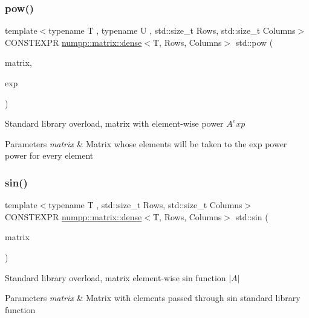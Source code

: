 \subsubsection{\texorpdfstring{pow()}{pow()}}
{\footnotesize\ttfamily template$<$typename T , typename U , std\+::size\+\_\+t Rows, std\+::size\+\_\+t Columns$>$ \\
C\+O\+N\+S\+T\+E\+X\+PR \hyperlink{classnumpp_1_1matrix_1_1dense}{numpp\+::matrix\+::dense}$<$T, Rows, Columns$>$ std\+::pow (\begin{DoxyParamCaption}\item[{const \hyperlink{classnumpp_1_1matrix_1_1dense}{numpp\+::matrix\+::dense}$<$ T, Rows, Columns $>$ \&}]{matrix,  }\item[{U \&\&}]{exp }\end{DoxyParamCaption})}

Standard library overload, matrix with element-\/wise power $A^exp$


\begin{DoxyParams}{Parameters}
{\em matrix} & Matrix whose elements will be taken to the exp power  power for every element\\
\hline
\end{DoxyParams}
\mbox{\label{group__numpp__structures__matrices__dense_ga3cccd3987b35936ecd0368f9dc4d6832}} 
\subsubsection{\texorpdfstring{sin()}{sin()}}
{\footnotesize\ttfamily template$<$typename T , std\+::size\+\_\+t Rows, std\+::size\+\_\+t Columns$>$ \\
C\+O\+N\+S\+T\+E\+X\+PR \hyperlink{classnumpp_1_1matrix_1_1dense}{numpp\+::matrix\+::dense}$<$T, Rows, Columns$>$ std\+::sin (\begin{DoxyParamCaption}\item[{const \hyperlink{classnumpp_1_1matrix_1_1dense}{numpp\+::matrix\+::dense}$<$ T, Rows, Columns $>$ \&}]{matrix }\end{DoxyParamCaption})}

Standard library overload, matrix element-\/wise sin function $|A|$


\begin{DoxyParams}{Parameters}
{\em matrix} & Matrix with elements passed through sin standard library function\\
\hline
\end{DoxyParams}
\mbox{\label{group__numpp__structures__matrices__dense_gac89face89afdd17bfd0c07fda3997db2}} 
